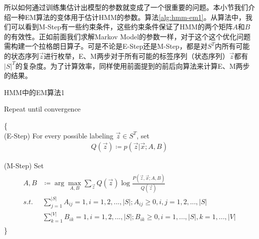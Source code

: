 所以如何通过训练集估计出模型的参数就变成了一个很重要的问题。本小节我们介绍一种EM算法的变体用于估计HMM的参数。算法\ref{alg:hmm-em1}。从算法中，我们可以看到M-Step有一些约束条件，这些约束条件保证了HMM的两个矩阵$A$和$B$的有效性。正如前面我们求解Markov Model的参数一样，对于这个这个优化问题需构建一个拉格朗日算子。可是不论是E-Step还是M-Step，都是对$S^{T}$内所有可能的状态序列$\vec{z}$进行枚举，E、M两步对于所有可能的标签序列（状态序列）$\vec{z}$都有$|S|^{T}$的复杂度。为了计算效率，同样使用前面提到的前后向算法来计算E、M两步的结果。
\begin{algorithm}
\caption{HMM中的EM算法1} 
\label{alg:hmm-em1}
\begin{algorithmic}[1]
  Repeat until convergence

  \{             \\
     (E-Step) For every possible labeling $\vec{z}\in{S^{T}}$, set \\
     \begin{align}\nonumber
      Q(\vec{z}) \coloneqq p(\vec{z}|\vec{x};A,B)
     \end{align}

     (M-Step) Set \\
     \begin{align}\nonumber
     \begin{split}
      A, B &\coloneqq \arg\mathop{\max}_{A,B}\sum_{\vec{z}}Q(\vec{z})\log\frac{P(\vec{z},\vec{x};A,B)}{Q(\vec{z})} \\
      s.t. &\sum_{j=1}^{|S|} A_{ij} = 1, i=1,2,...,|S|; A_{ij}\geq 0,i,j=1,2,...,|S|  \\
           &\sum_{k=1}^{|V|} B_{ik} = 1, i=1,2,...,|S|; B_{ik}\geq 0,i=1,...,|S|,k=1,...,|V|
      \end{split}
     \end{align}     
  \}
\end{algorithmic}
\end{algorithm}

